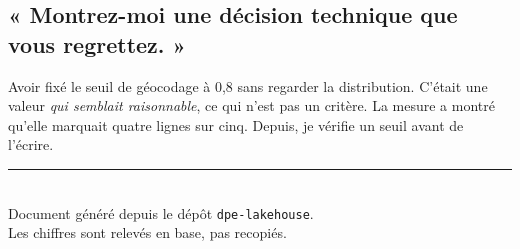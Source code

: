 \documentclass[11pt,a4paper]{article}
\newcommand{\cmd}[1]{\texttt{\small #1}}
\begin{document}
\subsection{« Montrez-moi une décision technique que vous regrettez. »}

Avoir fixé le seuil de géocodage à 0,8 sans regarder la distribution. C'était
une valeur \emph{qui semblait raisonnable}, ce qui n'est pas un critère. La
mesure a montré qu'elle marquait quatre lignes sur cinq. Depuis, je vérifie
un seuil avant de l'écrire.

\vfill
\begin{center}
\color{trait}\rule{0.4\textwidth}{0.8pt}\\[0.8em]
\color{encre3}\small
Document généré depuis le dépôt \cmd{dpe-lakehouse}.\\
Les chiffres sont relevés en base, pas recopiés.
\end{center}
\end{document}
